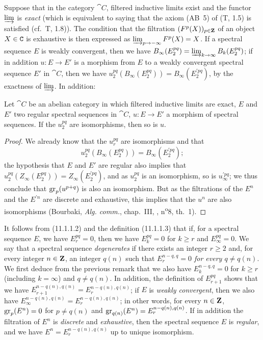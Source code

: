 \begin{env}[11.1.4]
\label{0.11.1.4}
Suppose that in the category $\cat{C}$, filtered inductive limits exist and the functor $\varinjlim$ is \emph{exact} (which is equivalent to saying that the axiom (AB~5) of (T, 1.5) is satisfied (cf.~T, 1.8)).
The condition that the filtration $(F^p(X))_{p\in\mathbf{Z}}$ of an object $X\in\mathtt{C}$ is exhaustive is then expressed as $\varinjlim_{p\to-\infty}F^p(X)=X$.
If a spectral sequence $E$ is weakly convergent, then we have $B_\infty(E_2^{pq})=\varinjlim_{k\to\infty}B_k(E_2^{pq})$; if in addition $u:E\to E'$ is a morphism from $E$ to a weakly convergent spectral sequence $E'$ in $\cat{C}$, then we have $u_2^{pq}(B_\infty(E_2^{pq}))=B_\infty(E_2^{\prime pq})$, by the exactness of $\varinjlim$.
In addition:
\end{env}

\begin{proposition}[11.1.5]
\label{0.11.1.5}
Let $\cat{C}$ be an abelian category in which filtered inductive limits are exact, $E$ and $E'$ two regular spectral sequences in $\cat{C}$, $u:E\to E'$ a morphism of spectral sequences.
If the $u_2^{pq}$ are isomorphisms, then so is $u$.
\end{proposition}

\begin{proof}
\label{proof-0.11.1.5}
We already know  that the $u_r^{pq}$ are isomorphisms and that
\[
  u_2^{pq}(B_\infty(E_2^{pq}))=B_\infty(E_2^{\prime pq});
\]
the hypothesis that $E$ and $E'$ are regular also implies that $u_2^{pq}(Z_\infty(E_2^{pq}))=Z_\infty(E_2^{\prime pq})$, and as $u_2^{pq}$ is an isomorphism, so is $u_\infty^{\prime pq}$; we thus conclude that $\operatorname{gr}_p(u^{p+q})$ is also an isomorphism.
But as the filtrations of the $E^n$ and the $E^{\prime n}$ are discrete and exhaustive, this implies that the $u^n$ are also isomorphisms (Bourbaki, \emph{Alg. comm.}, chap.~III, , n\textsuperscript{o}8, th.~1).
\end{proof}

\begin{env}[11.1.6]
\label{0.11.1.6}
It follows from (11.1.1.2) and the definition (11.1.1.3) that if, for a spectral sequence $E$, we have $E_r^{pq}=0$, then we have $E_k^{pq}=0$ for $k\geq r$ and $E_\infty^{pq}=0$.
We say that a spectral sequence \emph{degenerates} if there exists an integer $r\geq 2$ and, for every integer $n\in\mathbf{Z}$, an integer $q(n)$ such that \emph{$E_r^{n-q,q}=0$ for every $q\neq q(n)$}.
We first deduce from the previous remark that we also have $E_k^{n-q,q}=0$ for $k\geq r$ (including $k=\infty$) and $q\neq q(n)$.
In addition, the definition of $E_{r+1}^{pq}$ shows that we have $E_{r+1}^{n-q(n),q(n)}=E_r^{n-q(n),q(n)}$; if $E$ is \emph{weakly convergent}, then we also have $E_\infty^{n-q(n),q(n)}=E_r^{n-q(n),q(n)}$; in other words, for every $n\in\mathbf{Z}$, $\operatorname{gr}_p(E^n)=0$ for $p\neq q(n)$ and $\operatorname{gr}_{q(n)}(E^n)=E_r^{n-q(n),q(n)}$.
If in addition the filtration of $E^n$ is \emph{discrete} and \emph{exhaustive}, then the spectral sequence $E$ is \emph{regular}, and we have $E^n=E_r^{n-q(n),q(n)}$ up to unique isomorphism.
\end{env}

